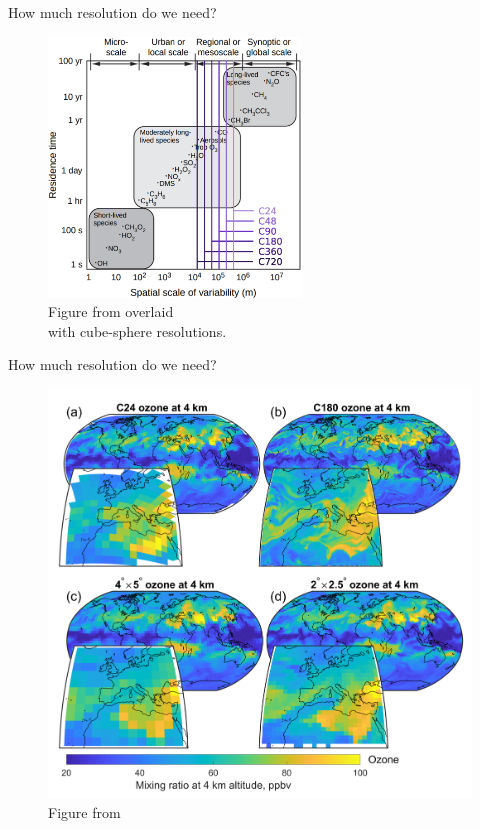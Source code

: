 \documentclass[10pt]{beamer}
\begin{document}
\begin{frame}[fragile]{How much resolution do we need?}
    \begin{figure}
        \centering
        \includegraphics[width=0.6\textwidth]{species-scale.eps}
        \captionsetup{labelformat=empty}
        \caption{Figure from \cite{wallace_atmospheric_2006} overlaid \\ with cube-sphere resolutions.}
    \end{figure}
\end{frame}

\begin{frame}[fragile]{How much resolution do we need?}
    \begin{figure}
        \centering
        \includegraphics[height=0.8\textheight]{easthamp.png}
        \captionsetup{labelformat=empty}
        \caption{Figure from \cite{eastham_geos-chem_2018}}
    \end{figure}
\end{frame}
\end{document}
